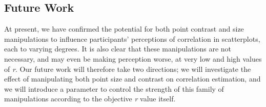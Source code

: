 \documentclass{vgtc}                          %
\begin{document}
\hypertarget{future-work}{%
\subsection{Future Work}\label{future-work}}

At present, we have confirmed the potential for both point contrast and size
manipulations to influence participants' perceptions of correlation in scatterplots,
each to varying degrees. It is also clear that these manipulations are not necessary,
and may even be making perception worse, at very low and high values of \emph{r}. Our
future work will therefore take two directions; we will investigate the effect of manipulating
both point size and contrast on correlation estimation, and we will introduce a
parameter to control the strength of this family of manipulations according to the
objective \emph{r} value itself.


%

%
%
%


\end{document}
